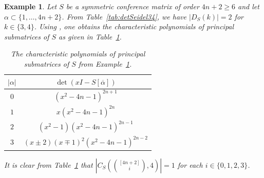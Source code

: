 \documentclass[11pt]{article}
\newtheorem{example}[theorem]{Example}
\begin{document}
\begin{example}
\label{ex:sym3}
Let $S$ be a symmetric conference matrix of order $4n+2 \geqslant 6$ and let $\alpha \subset \{1,\dots,4n+2\}$. 
From Table~\ref{tab:detSeidel34}, we have $|D_S(k)|=2$ for $k \in \{3,4\}$.
Using \cite[Section 4]{GS}, one obtains the characteristic polynomials of principal submatrices of $S$ as given in Table~\ref{tab:charSym3}.
\begin{table}[H]
    \centering
    \begin{tabular}{c|c}
        $|\alpha|$ & $\det(xI-S[\overline \alpha])$  \\
        \hline
        $0$ & $(x^2-4n-1)^{2n+1}$  \\
        $1$ & $x(x^2-4n-1)^{2n}$  \\
        $2$ & $(x^2-1)(x^2-4n-1)^{2n-1}$ \\
        $3$ & $(x\pm 2)(x\mp1)^2(x^2-4n-1)^{2n-2}$  \\
    \end{tabular}
    \caption{The characteristic polynomials of principal submatrices of $S$  from Example~\ref{ex:sym3}.}
    \label{tab:charSym3}
\end{table}
It is clear from Table~\ref{tab:charSym3} that $\left |C_S\left (\binom{[4n+2]}{i},4 \right )\right | = 1$ for each $i \in \{0,1,2,3\}$.

\end{example}
\end{document}
